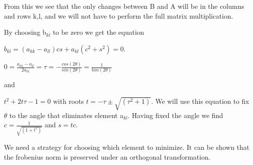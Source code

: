 From this we see that the only changes between B and A will be in the columns
and rows k,l, and we will not have to perform the full matrix multiplication.

By choosing b$_{kl}$ to be zero we get the equation

$b_{kl} = (a_{kk}-a_{ll})cs + a_{kl} (c^2 + s^2) = 0$.

$0 = \frac{a_{kk} - a_{ll}}{2a_{kl}} = \tau = -\frac{cos(2\theta)}{sin(2\theta)} = \frac{1}{tan(2\theta)}$

and

$t^2 + 2t\tau -1 = 0$ with roots $t = -\tau \pm \sqrt{(\tau^2 + 1)}$. We will
use this equation to fix $\theta$ to the angle that eliminates element a$_{kl}$.
Having fixed the angle we find $c = \frac{1}{\sqrt{(1+t^2)}}$ and $s = tc$.

We need a strategy for choosing which element to minimize. It can be shown that
the frobenius norm is preserved under an orthogonal transformation.
